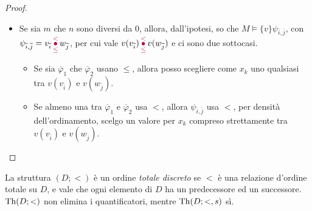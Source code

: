 \begin{proof}
\begin{itemize}
\begin{itemize}
            \item Se sia $m$ che $n$ sono diversi da 0, allora, dall'ipotesi, so che $M \models \{v\} \psi_{\overline i, \overline j}$, con $\psi_{\overline i, \overline j} = v_{\overline i} \,\textcolor{purple}{\underset{\leq}{\overset{<}{\bullet}}\,} w_{\overline j}$, per cui vale $v(v_{\overline i}) \,\textcolor{purple}{\underset{\leq}{\overset{<}{\bullet}}\,} v(w_{\overline j})$ e ci sono due sottocasi.
                  \begin{itemize}
                    \item[$\bullet$] Se sia $\overline \varphi_1$ che $\overline \varphi_2$ usano $\leq$, allora posso scegliere come $x_k$ uno qualsiasi tra $v(v_{\overline i})$ e $v(w_{\overline j})$.
                    \item[$\bullet$] Se almeno una tra $\overline \varphi_1$ e $\overline \varphi_2$ usa $<$, allora $\psi_{\overline i, \overline j}$ usa $<$, per densità dell'ordinamento, scelgo un valore per $x_k$ compreso strettamente tra $v(v_{\overline i})$ e $v(w_{\overline j})$.
                  \end{itemize}
                    \end{itemize}
    \end{itemize}
\end{proof}

\begin{exercise}
    La struttura $(D;<)$ è un ordine \emph{totale discreto} se $<$ è una relazione d'ordine totale su $D$, e vale che ogni elemento di $D$ ha un predecessore ed un successore.
    $\operatorname{Th}(D;<)$ non elimina i quantificatori, mentre $\operatorname{Th}(D;<,s)$ sì.
\end{exercise}

